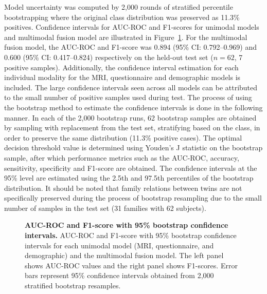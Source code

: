 \documentclass[10pt,letterpaper]{article}
\begin{document}
                                                                                                                         Model uncertainty was computed by 2,000 rounds of stratified percentile bootstrapping where the original class distribution was preserved as 11.3\% positives. Confidence intervals for AUC-ROC and F1-scores for unimodal models and multimodal fusion model are illustrated in Figure~\ref{fig:ci_barplot}. For the multimodal fusion model, the AUC-ROC and F1-score was 0.894 (95\% CI: 0.792--0.969) and 0.600 (95\% CI: 0.417--0.824) respectively on the held-out test set ($n = 62$, 7 positive samples). Additionally, the confidence interval estimation for each individual modality for the MRI, questionnaire and demographic models is included. The large confidence intervals seen across all models can be attributed to the small number of positive samples used during test.
                                                                                                                         The process of using the bootstrap method to estimate the confidence intervals is done in the following manner. In each of the 2,000 bootstrap runs, 62 bootstrap samples are obtained by sampling with replacement from the test set, stratifying based on the class, in order to preserve the same distribution (11.3\% positive cases). The optimal decision threshold value is determined using Youden's J statistic on the bootstrap sample, after which performance metrics such as the AUC-ROC, accuracy, sensitivity, specificity and F1-score are obtained. The confidence intervals at the 95\% level are estimated using the 2.5th and 97.5th percentiles of the bootstrap distribution. It should be noted that family relations between twins are not specifically preserved during the process of bootstrap resampling due to the small number of samples in the test set (31 families with 62 subjects).

                                                                                                                          \begin{figure}[!h]
                                                                                                                          \caption{\textbf{AUC-ROC and F1-score with 95\% bootstrap confidence intervals.}
                                                                                                                          AUC-ROC and F1-score with 95\% bootstrap confidence intervals for each unimodal model (MRI, questionnaire, and demographic) and the multimodal fusion model. The left panel shows AUC-ROC values and the right panel shows F1-scores. Error bars represent 95\% confidence intervals obtained from 2,000 stratified bootstrap resamples.}
                                                                                                                          \label{fig:ci_barplot}
                                                                                                                          \end{figure}
\end{document}
